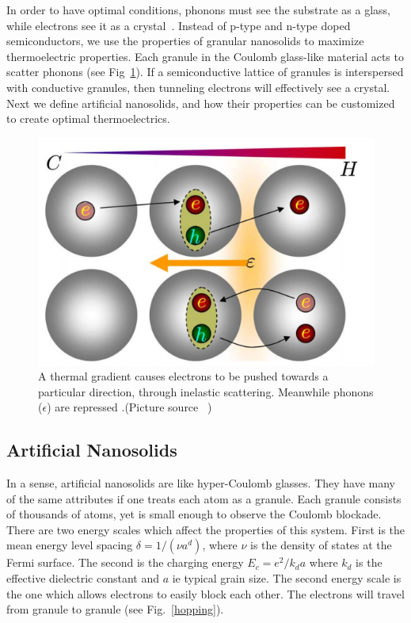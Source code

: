 In order to have optimal conditions, phonons must see the substrate as a glass, while electrons see it as a crystal~\cite{Rowe05}. Instead of p-type and n-type doped semiconductors, we use the properties of granular nanosolids to maximize thermoelectric properties. Each granule in the Coulomb glass-like material acts to scatter phonons (see Fig~\ref{heatFlow}). If a semiconductive lattice of granules is interspersed with conductive granules, then tunneling electrons will effectively see a crystal. Next we define artificial nanosolids, and how their properties can be customized to create optimal thermoelectrics. 

\begin{figure}[htbp]
\begin{center}
\includegraphics[scale=.50]{HeatFlow.png}
\caption{ A thermal gradient causes electrons to be pushed towards a particular direction, through inelastic scattering. Meanwhile phonons ($\epsilon$) are repressed .(Picture source ~\cite{glatz09})}
\label{heatFlow}
\end{center}
\end{figure}


\subsection{Artificial Nanosolids}

In a sense, artificial nanosolids are like hyper-Coulomb glasses. They have many of the same attributes if one treats each atom as a granule. Each granule consists of thousands of atoms, yet is small enough to observe the Coulomb blockade. There are two energy scales which affect the properties of this system. First is the mean energy level spacing $\delta = 1/(\nu a^d)$, where $\nu$ is the density of states at the Fermi surface. The second is the charging energy $E_c = e^2 / k_d a$ where $k_d$ is the effective dielectric constant and $a$ ie typical grain size.  The second energy scale is the one which allows electrons to easily block each other. The electrons will travel from granule to granule (see Fig.~\ref{hopping}).  

